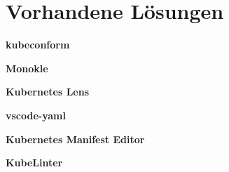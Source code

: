 \section{Vorhandene Lösungen}

\textbf{kubeconform}

\textbf{Monokle}

\textbf{Kubernetes Lens}

\textbf{\acs{vscode}-\ac{yaml}}

\textbf{Kubernetes Manifest Editor}

\textbf{KubeLinter}